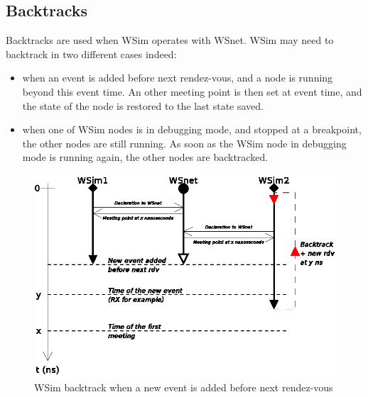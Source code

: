 \documentclass[a4paper,10pt]{report}
\begin{document}
\subsection{Backtracks}
Backtracks are used when WSim operates with WSnet. WSim may need to
backtrack in two different cases indeed:

\begin{itemize}
\item when an event is added before next rendez-vous, and a node is
  running beyond this event time. An other meeting point is then set
  at event time, and the state of the node is restored to the last
  state saved.
\item when one of WSim nodes is in debugging mode, and stopped at a
  breakpoint, the other nodes are still running. As soon as the WSim
  node in debugging mode is running again, the other nodes are
  backtracked.
\end{itemize}

\begin{figure}
\begin{center}
  \includegraphics[scale=1]{figures/wsim_backtrack1.eps}
\end{center}
\caption{WSim backtrack when a new event is added before next rendez-vous}
\label{wsim backtrack 1}
\end{figure}
\end{document}
